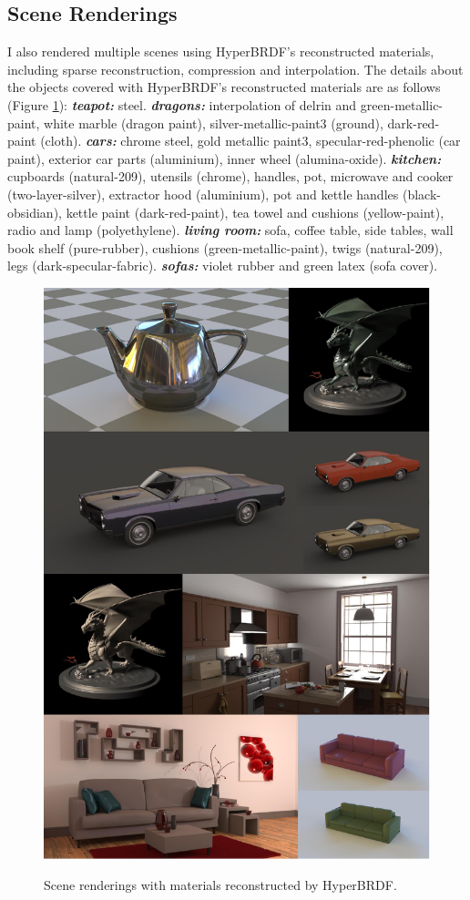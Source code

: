 \subsection{Scene Renderings}
I also rendered multiple scenes \cite{resources16} using HyperBRDF's reconstructed materials, including sparse reconstruction, compression and interpolation. The details about the objects covered with HyperBRDF's reconstructed materials are as follows (Figure \ref{fig:scene-render}): \textbf{\textit{teapot:}} steel. \textbf{\textit{dragons:}} interpolation of delrin and green-metallic-paint, white marble (dragon paint), silver-metallic-paint3 (ground), dark-red-paint (cloth). \textbf{\textit{cars:}} chrome steel, gold metallic paint3, specular-red-phenolic (car paint), exterior car parts (aluminium), inner wheel (alumina-oxide). \textbf{\textit{kitchen:}} cupboards (natural-209), utensils (chrome), handles, pot, microwave and cooker (two-layer-silver), extractor hood (aluminium), pot and kettle handles (black-obsidian), kettle paint (dark-red-paint), tea towel and cushions (yellow-paint), radio and lamp (polyethylene). \textbf{\textit{living room:}} sofa, coffee table, side tables, wall book shelf (pure-rubber), cushions (green-metallic-paint), twigs (natural-209), legs (dark-specular-fabric).
\textbf{\textit{sofas:}} violet rubber and green latex (sofa cover). 

\begin{figure}[ht]
  \centering
  {\includegraphics[width=0.7\linewidth]{Chapters/hyperbrdf-figs/SceneRenderings1.pdf}}
   \caption{Scene renderings with materials reconstructed by HyperBRDF.}
   \label{fig:scene-render}
\end{figure}

